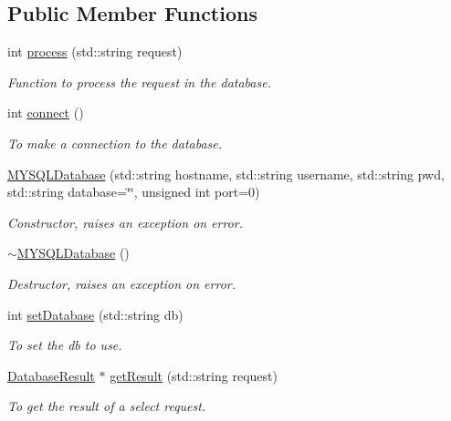 \subsection*{Public Member Functions}
\begin{DoxyCompactItemize}
\item 
int \hyperlink{classMYSQLDatabase_ae43c4557f43b775f26817082f4913d81}{process} (std::string request)
\begin{DoxyCompactList}\small\item\em Function to process the request in the database. \item\end{DoxyCompactList}\item 
int \hyperlink{classMYSQLDatabase_a3e0dc34a2b20ff76e5fa39cbe340c5d7}{connect} ()
\begin{DoxyCompactList}\small\item\em To make a connection to the database. \item\end{DoxyCompactList}\item 
\hyperlink{classMYSQLDatabase_a1c56aad9ac6ba53370f86852e702a0fc}{MYSQLDatabase} (std::string hostname, std::string username, std::string pwd, std::string database=\char`\"{}\char`\"{}, unsigned int port=0)
\begin{DoxyCompactList}\small\item\em Constructor, raises an exception on error. \item\end{DoxyCompactList}\item 
\hypertarget{classMYSQLDatabase_a5337e67330a1ffa3413a3e9725f1f1c0}{
\hyperlink{classMYSQLDatabase_a5337e67330a1ffa3413a3e9725f1f1c0}{$\sim$MYSQLDatabase} ()}
\label{classMYSQLDatabase_a5337e67330a1ffa3413a3e9725f1f1c0}

\begin{DoxyCompactList}\small\item\em Destructor, raises an exception on error. \item\end{DoxyCompactList}\item 
int \hyperlink{classMYSQLDatabase_a884c0742ea2d4d44d8c177144f5279ef}{setDatabase} (std::string db)
\begin{DoxyCompactList}\small\item\em To set the db to use. \item\end{DoxyCompactList}\item 
\hyperlink{classDatabaseResult}{DatabaseResult} $\ast$ \hyperlink{classMYSQLDatabase_a4e3804ff11f44b3e5770932c8351ea92}{getResult} (std::string request)
\begin{DoxyCompactList}\small\item\em To get the result of a select request. \item\end{DoxyCompactList}\end{DoxyCompactItemize}
